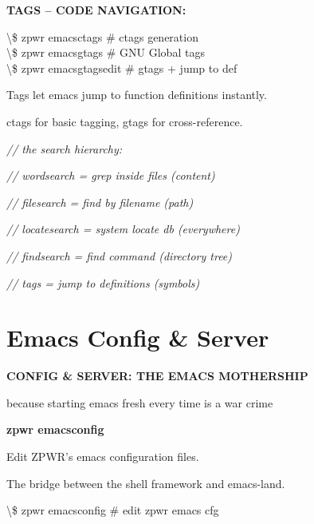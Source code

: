\documentclass[11pt,a4paper,twoside]{book}
\begin{document}
\vspace{12pt}
{\bfseries\color{neonyellow} TAGS -- CODE NAVIGATION:}\vspace{4pt}

\begin{codebox}
\textbackslash{}\$ zpwr emacsctags             \# ctags generation\\
\textbackslash{}\$ zpwr emacsgtags             \# GNU Global tags\\
\textbackslash{}\$ zpwr emacsgtagsedit         \# gtags + jump to def\\
\end{codebox}

Tags let emacs jump to function definitions instantly.

ctags for basic tagging, gtags for cross-reference.

{\small\itshape\color{dimtext} // the search hierarchy:}

{\small\itshape\color{dimtext} //   wordsearch  = grep inside files (content)}

{\small\itshape\color{dimtext} //   filesearch  = find by filename (path)}

{\small\itshape\color{dimtext} //   locatesearch = system locate db (everywhere)}

{\small\itshape\color{dimtext} //   findsearch  = find command (directory tree)}

{\small\itshape\color{dimtext} //   tags        = jump to definitions (symbols)}


\vspace{16pt}

\section{Emacs Config \& Server}


\vspace{10pt}
{\large\bfseries\color{neoncyan} CONFIG \& SERVER: THE EMACS MOTHERSHIP}\vspace{6pt}

because starting emacs fresh every time is a war crime


\vspace{12pt}
{\bfseries\color{neonyellow} zpwr emacsconfig}\vspace{4pt}

Edit ZPWR's emacs configuration files.

The bridge between the shell framework and emacs-land.

\begin{codebox}
\textbackslash{}\$ zpwr emacsconfig            \# edit zpwr emacs cfg\\
\end{codebox}
\end{document}
